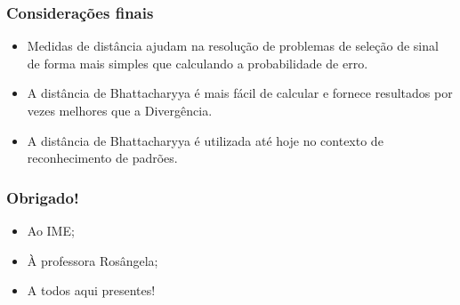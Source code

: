 \documentclass{beamer}
\begin{document}
\begin{frame}

	\frametitle{Considerações finais}
	
	\begin{itemize}
		\setlength\itemsep{1em}
		
		\item Medidas de distância ajudam na resolução de problemas de seleção de sinal de forma mais simples que calculando a probabilidade de erro.
		\item A distância de Bhattacharyya é mais fácil de calcular e fornece resultados por vezes melhores que a Divergência.
		\item A distância de Bhattacharyya é utilizada até hoje no contexto de reconhecimento de padrões.
	
	\end{itemize}


\end{frame}


\begin{frame}
	\frametitle{Obrigado!}
    
    \centering
    
    \begin{itemize}
    	\setlength\itemsep{2em}
		\item Ao IME;
        \item À professora Rosângela;
        \item A todos aqui presentes!
	\end{itemize}

\end{frame}
\end{document}
